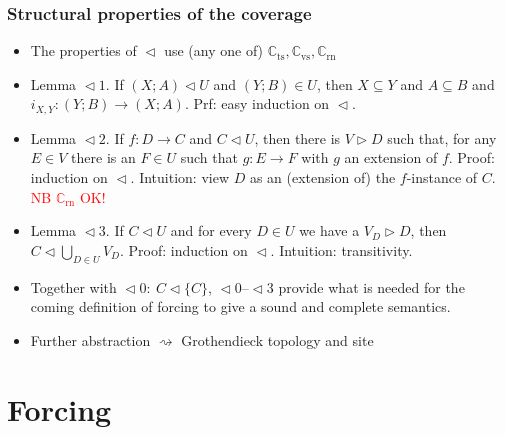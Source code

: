 \documentclass[handout,11pt]{beamer}
\newcommand{\red}[1]{\textcolor{red}{#1}}
\newcommand{\set}[1]{\{#1\}}
\newcommand{\covd}{\mathrel{\vartriangleleft}}
\newcommand{\covs}{\mathrel{\vartriangleright}}
\newcommand{\covT}{\mathrel{\vartriangleleft_T}}
\newcommand*{\subvs}{_{\mathrm{vs}}}
\newcommand*{\subrn}{_{\mathrm{rn}}}
\newcommand*{\subts}{_{\mathrm{ts}}}
\newcommand{\Cvs}{\mathbb{C}\subvs}
\newcommand{\Crn}{\mathbb{C}\subrn}
\newcommand{\Cts}{\mathbb{C}\subts}
\begin{document}
\begin{frame}
\frametitle{Structural properties of the coverage}
 \begin{itemize}[<+->]   %
    \item The properties of $\covd$ use (any one of) $\Cts,\Cvs,\Crn$
    \item Lemma ${\covd}1$. If $(X;A) \covd U$ and $(Y;B)\in U$,
    then $X\subseteq Y$ and $A\subseteq B$ and $i_{X,Y} : (Y;B)\to(X;A)$.
    Prf: easy induction on $\covd$.
    \item Lemma ${\covd}2$. If $f:D\to C$ and $C\covd U$, then there is
    $V\covs D$ such that, for any $E\in V$ there is an $F\in U$ such 
    that $g:E\to F$ with $g$ an extension of $f$.
    Proof: induction on $\covd$. Intuition: view $D$ as an (extension of) the
    $f$-instance of $C$. \red{NB $\Crn$ OK!}
    \item Lemma ${\covd}3$. If $C \covd U$ and for every $D\in U$
    we have a $V_D \covs D$, then $C\covd\bigcup_{D\in U} V_D$.
    Proof: induction on $\covd$. Intuition: transitivity.
    \item Together with ${\covd}0:~C \covd\set{C}$, ${\covd}$0--${\covd}$3
    provide what is needed for the coming definition of forcing to
    give a sound and complete semantics.
    \item Further abstraction $\rightsquigarrow$ Grothendieck topology and site
    
 \end{itemize}
\end{frame}

\section{Forcing}
\end{document}
